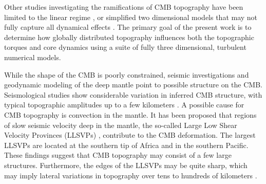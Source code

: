 Other studies investigating the ramifications of CMB topography have been limited to the linear regime \citep{pB96}, or simplified two dimensional models that may not fully capture all dynamical effects \citep{jH98,mW03,mC12}. 
The primary goal of the present work is to determine how globally distributed topography influences both the topographic torques and core dynamics using a suite of fully three dimensional, turbulent numerical models. 

While the shape of the CMB is poorly constrained, seismic investigations and geodynamic modeling of the deep mantle point to possible structure on the CMB. 
Seismological studies show considerable variation in inferred CMB structure, with typical topographic amplitudes up to a few kilometers \citep{kK03,sT10}. 
A possible cause for CMB topography is convection in the mantle. 
It has been proposed that regions of slow seismic velocity deep in the mantle, the so-called Large Low Shear Velocity Provinces (LLSVPs) \citep{sC16,pK21}, contribute to the CMB deformation. 
The largest LLSVPs are located at the southern tip of Africa and in the southern Pacific. These findings suggest that CMB topography may consist of a few large structures. 
Furthermore, the edges of the LLSVPs may be quite sharp, which may imply lateral variations in topography over tens to hundreds of kilometers \citep{sC16}. 

%


